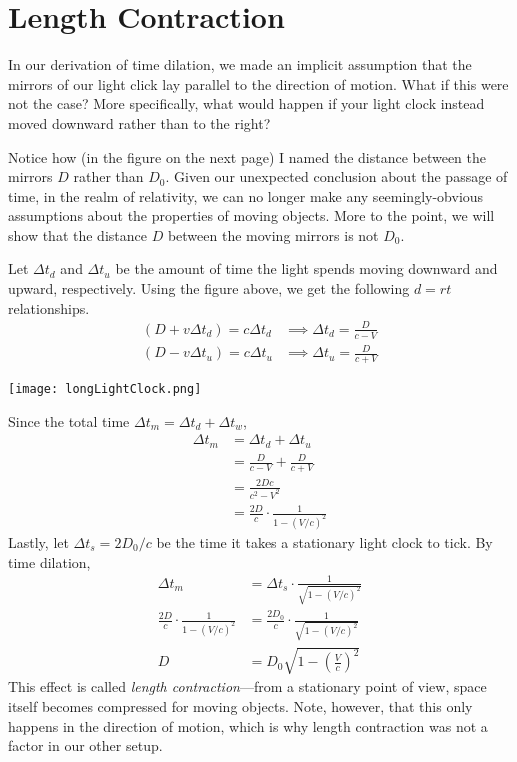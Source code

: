 \documentclass[../p023main.tex]{subfiles}
\begin{document}
\section{Length Contraction}
In our derivation of time dilation, we made an implicit assumption that the mirrors of our light click lay parallel to the direction of motion.
What if this were not the case?
More specifically, what would happen if your light clock instead moved downward rather than to the right?

Notice how (in the figure on the next page) I named the distance between the mirrors $D$ rather than $D_0$.
Given our unexpected conclusion about the passage of time, in the realm of relativity, we can no longer make any seemingly-obvious assumptions about the properties of moving objects.
More to the point, we will show that the distance $D$ between the moving mirrors is not $D_0$.

Let $\Delta t_d$ and $\Delta t_u$ be the amount of time the light spends moving downward and upward, respectively.
Using the figure above, we get the following $d = rt$ relationships.
\begin{align*}
    (D + v \Delta t_d) = c \Delta t_d &\implies \Delta t_d = \frac{D}{c - V} \\
    (D - v \Delta t_u) = c \Delta t_u &\implies \Delta t_u = \frac{D}{c + V}
\end{align*}
\begin{center}
    \texttt{[image: longLightClock.png]}
\end{center}
Since the total time $\Delta t_m = \Delta t_d + \Delta t_w$,
\begin{align*}
    \Delta t_m &= \Delta t_d + \Delta t_u \\
    &= \frac{D}{c - V} + \frac{D}{c + V} \\
    &= \frac{2Dc}{c^2 - V^2} \\
    &= \frac{2D}{c} \cdot \frac{1}{1 - \left( V / c \right)^2}
\end{align*}
Lastly, let $\Delta t_s = 2D_0 / c$ be the time it takes a stationary light clock to tick.
By time dilation,
\begin{align*}
    \Delta t_m &= \Delta t_s \cdot \frac{1}{\sqrt{1 - \left( V / c \right)^2}} \\
    \frac{2D}{c} \cdot \frac{1}{1 - \left( V / c \right)^2} &= \frac{2D_0}{c} \cdot \frac{1}{\sqrt{1 - \left( V / c \right)^2}} \\
    D &= D_0 \sqrt{1 - \left( \frac{V}{c} \right)^2}
\end{align*}
This effect is called \textit{length contraction}---from a stationary point of view, space itself becomes compressed for moving objects.
Note, however, that this only happens in the direction of motion, which is why length contraction was not a factor in our other setup.
\end{document}
